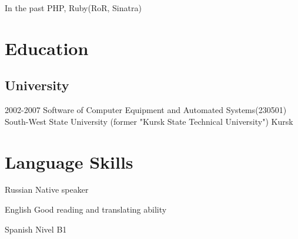 \documentclass[11pt,a4paper,sans]{moderncv}
\newcommand{\lang}[2]{#2}
\begin{document}
\cvline
    {\lang
        {В прошлом}
        {In the past}}
    {PHP, Ruby(RoR, Sinatra)}

\section
    {\lang
        {Образование}
        {Education}}

\subsection
    {\lang
        {Высшее образование}
        {University}}

\cventry
    {2002-2007}
    {\lang
        {Инженер по специальности «Программное обеспечение вычислительной техники и автоматизированных систем»}
        {Software of Computer Equipment and Automated Systems(230501)}}
    {\lang
        {«Юго-Западный государственный университет» (бывший «Курский государственный технический университет»)}
        {South-West State University (former "Kursk State Technical University")}}
    {\lang
        {Курск}
        {Kursk}}
    {}
    {}

\section
    {\lang
        {Языки}
        {Language Skills}}

\cvlanguage
    {\lang
        {Русский}
        {Russian}}
    {\lang
        {родной язык}
        {Native speaker}}
    {}

\cvlanguage
    {\lang
        {Английский}
        {English}}
    {\lang
        {читаю техническую литературу, могу поддержать разговор}
        {Good reading and translating ability}}
    {}

\cvlanguage
    {\lang
        {Испанский}
        {Spanish}}
    {\lang
        {уровень B1}
        {Nivel B1}}
    {}
\end{document}

